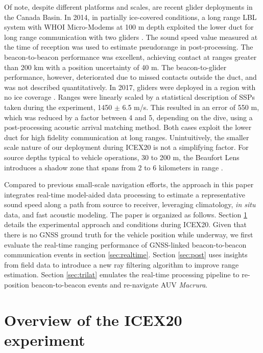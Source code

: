 \documentclass[preprint,TurnOnLineNumbers]{JASA}
\begin{document}
Of note, despite different platforms and scales, are recent glider deployments in the Canada Basin.
In 2014, in partially ice-covered conditions, a long range LBL system with WHOI Micro-Modems at 100 m depth exploited the lower duct for long range communication with two gliders \citep{Freitag2016,Webster2015}.
The sound speed value measured at the time of reception was used to estimate pseudorange in post-processing.
The beacon-to-beacon performance was excellent, achieving contact at ranges greater than 200 km with a position uncertainty of 40 m.
The beacon-to-glider performance, however, deteriorated due to missed contacts outside the duct, and was not described quantitatively.
In 2017, gliders were deployed in a region with no ice coverage \citep{Graupe2019}.
Ranges were linearly scaled by a statistical description of SSPs taken during the experiment, 1450 $\pm$ 6.5 m/s.
This resulted in an error of 550 m, which was reduced by a factor between 4 and 5, depending on the dive, using a post-processing acoustic arrival matching method.
Both cases exploit the lower duct for high fidelity communication at long ranges.
Unintuitively, the smaller scale nature of our deployment during ICEX20 is not a simplifying factor.
For source depths typical to vehicle operations, 30 to 200 m, the Beaufort Lens introduces a shadow zone that spans from 2 to 6 kilometers in range \citep{schmidt_acoustic_2016}.

Compared to previous small-scale navigation efforts, the approach in this paper integrates real-time model-aided data processing to estimate a representative sound speed along a path from source to receiver, leveraging climatology, \textit{in situ} data, and fast acoustic modeling.
The paper is organized as follows.
Section \ref{sec:icex20} details the experimental approach and conditions during ICEX20.
Given that there is no GNSS ground truth for the vehicle position while underway, we first evaluate the real-time ranging performance of GNSS-linked beacon-to-beacon communication events in section \ref{sec:realtime}.
Section \ref{sec:post} uses insights from field data to introduce a new ray filtering algorithm to improve range estimation.
Section \ref{sec:trilat} emulates the real-time processing pipeline to re-position beacon-to-beacon events and re-navigate AUV \emph{Macrura}.

\clearpage
\section{Overview of the ICEX20 experiment}\label{sec:icex20}
\end{document}
